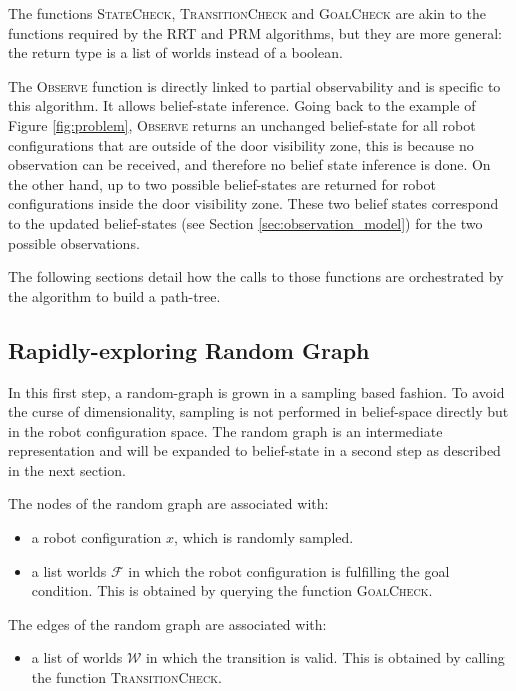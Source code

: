\documentclass[letterpaper, 10 pt, conference]{ieeeconf}  %
\begin{document}
The functions \textsc{StateCheck}, \textsc{TransitionCheck} and \textsc{GoalCheck} are akin to the functions required by the RRT and PRM algorithms, but they are more general: the return type is a list of worlds instead of a boolean.

The \textsc{Observe} function is directly linked to partial observability and is specific to this algorithm. It allows belief-state inference. Going back to the example of Figure \ref{fig:problem}, \textsc{Observe} returns an unchanged belief-state for all robot configurations that are outside of the door visibility zone, this is because no observation can be received, and therefore no belief state inference is done. On the other hand, up to two possible belief-states are returned for robot configurations inside the door visibility zone. These two belief states correspond to the updated belief-states (see Section \ref{sec:observation_model}) for the two possible observations.

The following sections detail how the calls to those functions are orchestrated by the algorithm to build a path-tree.

\subsection{Rapidly-exploring Random Graph}
In this first step, a random-graph is grown in a sampling based fashion. To avoid the curse of dimensionality, sampling is not performed in belief-space directly but in the robot configuration space. The random graph is an intermediate representation and will be expanded to belief-state in a second step as described in the next section.

The nodes of the random graph are associated with:
\begin{itemize}
\item a robot configuration $x$, which is randomly sampled.
\item a list worlds $\mathcal{F}$ in which the robot configuration is fulfilling the goal condition. This is obtained by querying the function \textsc{GoalCheck}. 
\end{itemize} 

The edges of the random graph are associated with:
\begin{itemize}
\item a list of worlds $\mathcal{W}$ in which the transition is valid. This is obtained by calling the function \textsc{TransitionCheck}.
\end{itemize}
\end{document}
